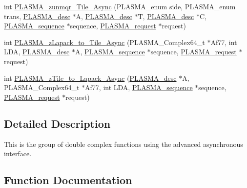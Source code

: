 \begin{DoxyCompactItemize}
\item 
int \hyperlink{group__PLASMA__Complex64__t__Tile__Async_ga65bce78bfc91e50cd35cdb87521ce9a4_ga65bce78bfc91e50cd35cdb87521ce9a4}{P\+L\+A\+S\+M\+A\+\_\+zunmqr\+\_\+\+Tile\+\_\+\+Async} (P\+L\+A\+S\+M\+A\+\_\+enum side, P\+L\+A\+S\+M\+A\+\_\+enum trans, \hyperlink{structplasma__desc__t}{P\+L\+A\+S\+M\+A\+\_\+desc} $\ast$A, \hyperlink{structplasma__desc__t}{P\+L\+A\+S\+M\+A\+\_\+desc} $\ast$T, \hyperlink{structplasma__desc__t}{P\+L\+A\+S\+M\+A\+\_\+desc} $\ast$C, \hyperlink{structplasma__sequence__t}{P\+L\+A\+S\+M\+A\+\_\+sequence} $\ast$sequence, \hyperlink{structplasma__request__t}{P\+L\+A\+S\+M\+A\+\_\+request} $\ast$request)
\item 
int \hyperlink{group__PLASMA__Complex64__t__Tile__Async_ga3a85e3d7fff8991650e1b1f9761c9153_ga3a85e3d7fff8991650e1b1f9761c9153}{P\+L\+A\+S\+M\+A\+\_\+z\+Lapack\+\_\+to\+\_\+\+Tile\+\_\+\+Async} (P\+L\+A\+S\+M\+A\+\_\+\+Complex64\+\_\+t $\ast$Af77, int L\+D\+A, \hyperlink{structplasma__desc__t}{P\+L\+A\+S\+M\+A\+\_\+desc} $\ast$A, \hyperlink{structplasma__sequence__t}{P\+L\+A\+S\+M\+A\+\_\+sequence} $\ast$sequence, \hyperlink{structplasma__request__t}{P\+L\+A\+S\+M\+A\+\_\+request} $\ast$request)
\item 
int \hyperlink{group__PLASMA__Complex64__t__Tile__Async_ga27044f3ec4b95defcb842009096ff2a3_ga27044f3ec4b95defcb842009096ff2a3}{P\+L\+A\+S\+M\+A\+\_\+z\+Tile\+\_\+to\+\_\+\+Lapack\+\_\+\+Async} (\hyperlink{structplasma__desc__t}{P\+L\+A\+S\+M\+A\+\_\+desc} $\ast$A, P\+L\+A\+S\+M\+A\+\_\+\+Complex64\+\_\+t $\ast$Af77, int L\+D\+A, \hyperlink{structplasma__sequence__t}{P\+L\+A\+S\+M\+A\+\_\+sequence} $\ast$sequence, \hyperlink{structplasma__request__t}{P\+L\+A\+S\+M\+A\+\_\+request} $\ast$request)
\end{DoxyCompactItemize}


\subsection{Detailed Description}
This is the group of double complex functions using the advanced asynchronous interface. 

\subsection{Function Documentation}
\hypertarget{group__PLASMA__Complex64__t__Tile__Async_ga996b201266467b1742e9797eea79130d_ga996b201266467b1742e9797eea79130d}{}
